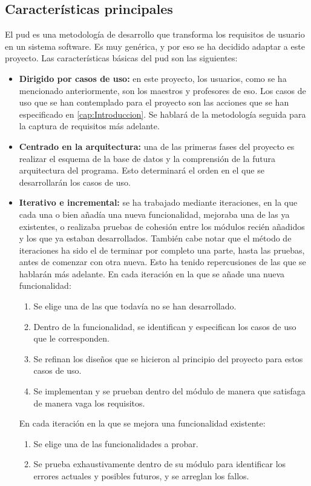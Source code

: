 \subsection{Características principales}
El \gls{pud} es una metodología de desarrollo que transforma los requisitos de usuario en un sistema software. Es muy genérica, y por eso se ha decidido adaptar a este proyecto.
Las características básicas del \gls{pud} son las siguientes:
\begin{itemize}
	\item \textbf{Dirigido por casos de uso:} en este proyecto, los usuarios, como se ha mencionado anteriormente, son los maestros y profesores de \gls{eso}. Los casos de uso que se han contemplado para el proyecto son las acciones que se han especificado en \ref{cap:Introduccion}. Se hablará de la metodología seguida para la captura de requisitos más adelante.
	\item \textbf{Centrado en la arquitectura:} una de las primeras fases del proyecto es realizar el esquema de la base de datos y la comprensión de la futura arquitectura del programa. Esto determinará el orden en el que se desarrollarán los casos de uso.
	\item \textbf{Iterativo e incremental:} se ha trabajado mediante iteraciones, en la que cada una o bien añadía una nueva funcionalidad, mejoraba una de las ya existentes, o realizaba pruebas de cohesión entre los módulos recién añadidos y los que ya estaban desarrollados. También cabe notar que el método de iteraciones ha sido el de terminar por completo una parte, hasta las pruebas, antes de comenzar con otra nueva. Esto ha tenido repercusiones de las que se hablarán más adelante. En cada iteración en la que se añade una nueva funcionalidad:
	\begin{enumerate}
		\item Se elige una de las que todavía no se han desarrollado.
		\item Dentro de la funcionalidad, se identifican y especifican los casos de uso que le corresponden.
		\item Se refinan los diseños que se hicieron al principio del proyecto para estos casos de uso.
		\item Se implementan y se prueban dentro del módulo de manera que satisfaga de manera vaga los requisitos.
	\end{enumerate}
	
	En cada iteración en la que se mejora una funcionalidad existente:
	\begin{enumerate}
		\item Se elige una de las funcionalidades a probar.
		\item Se prueba exhaustivamente dentro de su módulo para identificar los errores actuales y posibles futuros, y se arreglan los fallos.
	\end{enumerate}
	

\end{itemize}

